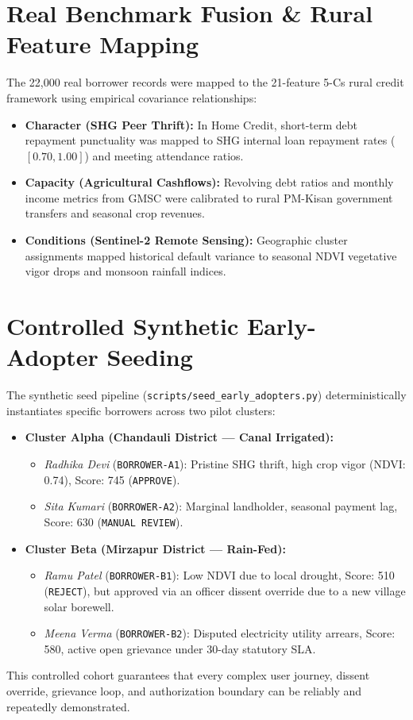\section{Real Benchmark Fusion \& Rural Feature Mapping}
The 22,000 real borrower records were mapped to the 21-feature 5-Cs rural credit framework using empirical covariance relationships:
\begin{itemize}
  \item \textbf{Character (SHG Peer Thrift):} In Home Credit, short-term debt repayment punctuality was mapped to SHG internal loan repayment rates ($[0.70, 1.00]$) and meeting attendance ratios.
  \item \textbf{Capacity (Agricultural Cashflows):} Revolving debt ratios and monthly income metrics from GMSC were calibrated to rural PM-Kisan government transfers and seasonal crop revenues.
  \item \textbf{Conditions (Sentinel-2 Remote Sensing):} Geographic cluster assignments mapped historical default variance to seasonal NDVI vegetative vigor drops and monsoon rainfall indices.
\end{itemize}

\section{Controlled Synthetic Early-Adopter Seeding}
The synthetic seed pipeline (\texttt{scripts/seed\_early\_adopters.py}) deterministically instantiates specific borrowers across two pilot clusters:
\begin{itemize}
  \item \textbf{Cluster Alpha (Chandauli District --- Canal Irrigated):}
    \begin{itemize}
      \item \textit{Radhika Devi} (\texttt{BORROWER-A1}): Pristine SHG thrift, high crop vigor (NDVI: 0.74), Score: 745 (\texttt{APPROVE}).
      \item \textit{Sita Kumari} (\texttt{BORROWER-A2}): Marginal landholder, seasonal payment lag, Score: 630 (\texttt{MANUAL REVIEW}).
    \end{itemize}
  \item \textbf{Cluster Beta (Mirzapur District --- Rain-Fed):}
    \begin{itemize}
      \item \textit{Ramu Patel} (\texttt{BORROWER-B1}): Low NDVI due to local drought, Score: 510 (\texttt{REJECT}), but approved via an officer dissent override due to a new village solar borewell.
      \item \textit{Meena Verma} (\texttt{BORROWER-B2}): Disputed electricity utility arrears, Score: 580, active open grievance under 30-day statutory SLA.
    \end{itemize}
\end{itemize}
This controlled cohort guarantees that every complex user journey, dissent override, grievance loop, and authorization boundary can be reliably and repeatedly demonstrated.
